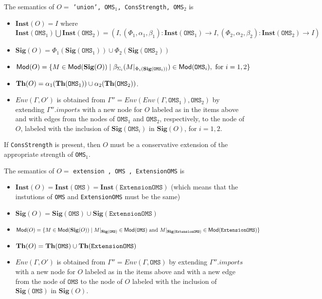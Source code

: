 \documentclass[10pt,fleqn,%
\ifpretendfinal
final%
\else
draft%
\fi,
]{scrreprt}
\newcommand*{\syntax}[1]{\texttt{#1}}
\newcommand{\Sig}{\mathbf{Sig}}
\newcommand{\Inst}{\ensuremath{\mathbf{Inst}}}
\begin{document}
The semantics of $O =$
\syntax{'union', OMS$_1$, ConsStrength, OMS$_2$} is
\begin{itemize}
  \item $\Inst(O) = I$ where
    $\Inst(\syntax{OMS}_1) \bigcup \Inst(\syntax{OMS}_2) =(I, (\Phi_1, \alpha_1,\beta_1) : \Inst(\syntax{OMS}_1) \rightarrow I, 
                    (\Phi_2, \alpha_2,\beta_2) : \Inst(\syntax{OMS}_2) \rightarrow I)$
  \item $\Sig(O) = \Phi_1(\Sig(\syntax{OMS}_1)) \cup \Phi_2(\Sig(\syntax{OMS}_2))$
  \item $\Mod(O) = \{ M\in \Mod(\Sig(O)) \mid \beta_{\Sigma_i}(M\forget{\Phi_i(\Sig(\syntax{OMS}_i))}) \in \Mod(\syntax{OMS}_i), \text{ for } i=1,2 \}$
  \item $\Th(O) = \alpha_1(\Th(\syntax{OMS}_1)) \cup \alpha_2(\Th(\syntax{OMS}_2))$.
    \item 
        $Env(\Gamma, O')$ is obtained from 
       $\Gamma'' = Env(Env(\Gamma,\syntax{OMS}_1), \syntax{OMS}_2)$
       by extending $\Gamma''.imports$
       with a new node for $O$ labeled as in the items above and
       with edges from the nodes of $\syntax{OMS}_1$ and $\syntax{OMS}_2$,
       respectively, to the node of $O$,
        labeled with the inclusion of $\Sig(\syntax{OMS}_i)$ in $\Sig(O)$,
        for $i=1,2$.
\end{itemize}

If \syntax{ConsStrength} is present, then $O$ must be a conservative extension
of the appropriate strength of \syntax{OMS}$_1$.


The semantics of $O=$
\syntax{extension , OMS , ExtensionOMS} is

\begin{itemize}
  \item $\Inst(O) = \Inst(\syntax{OMS}) = \Inst(\syntax{ExtensionOMS})$ 
  (which means that
  the instutions of \syntax{OMS} and 
  \syntax{ExtensionOMS} must be the same)
  \item $\Sig(O) = \Sig(\syntax{OMS}) \cup \Sig(\syntax{ExtensionOMS})$
  \item $\Mod(O) = \{ M\in \Mod(\Sig(O)) \mid M\forget{\Sig(\syntax{OMS})} \in \Mod(\syntax{OMS})
  \text{ and }
  M \forget{\Sig(\syntax{ExtensionOMS})} \in \Mod(\syntax{ExtensionOMS})\}$
  \item $\Th(O) = \Th(\syntax{OMS}) \cup \Th(\syntax{ExtensionOMS})$
  \item $Env(\Gamma, O')$ is obtained from 
       $\Gamma'' = Env(\Gamma, \syntax{OMS})$
       by extending $\Gamma''.imports$
       with a new node for $O$ labeled as in the items above and
       with a new edge from the node of $\syntax{OMS}$ to the node of $O$
        labeled with the inclusion of $\Sig(\syntax{OMS})$ in 
        $\Sig(O)$.
\end{itemize}
\end{document}
